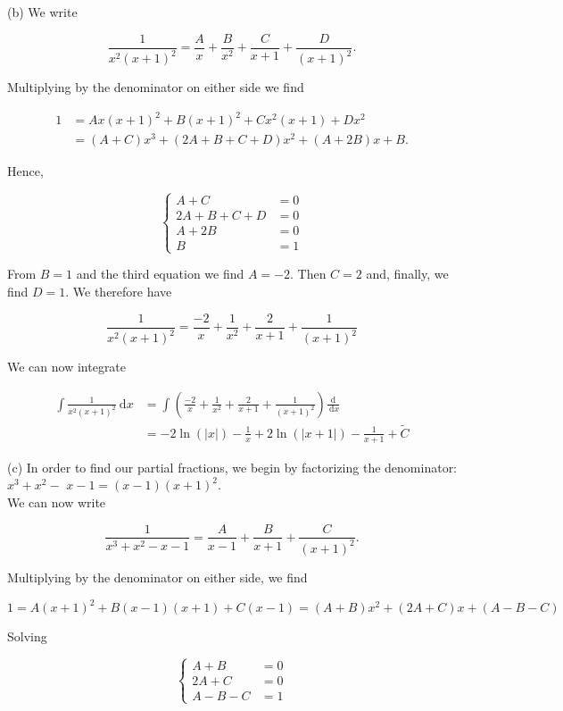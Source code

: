 \documentclass[10pt]{article}
\begin{document}
(b) We write

$$
\frac{1}{x^{2}(x+1)^{2}}=\frac{A}{x}+\frac{B}{x^{2}}+\frac{C}{x+1}+\frac{D}{(x+1)^{2}} .
$$

Multiplying by the denominator on either side we find

$$
\begin{aligned}
1 & =A x(x+1)^{2}+B(x+1)^{2}+C x^{2}(x+1)+D x^{2} \\
& =(A+C) x^{3}+(2 A+B+C+D) x^{2}+(A+2 B) x+B .
\end{aligned}
$$

Hence,

$$
\left\{\begin{aligned}
A+C & =0 \\
2 A+B+C+D & =0 \\
A+2 B & =0 \\
B & =1
\end{aligned}\right.
$$

From $B=1$ and the third equation we find $A=-2$. Then $C=2$ and, finally, we find $D=1$. We therefore have

$$
\frac{1}{x^{2}(x+1)^{2}}=\frac{-2}{x}+\frac{1}{x^{2}}+\frac{2}{x+1}+\frac{1}{(x+1)^{2}}
$$

We can now integrate

$$
\begin{aligned}
\int \frac{1}{x^{2}(x+1)^{2}} \mathrm{~d} x & =\int\left(\frac{-2}{x}+\frac{1}{x^{2}}+\frac{2}{x+1}+\frac{1}{(x+1)^{2}}\right) \frac{\mathrm{d}}{\mathrm{~d} x} \\
& =-2 \ln (|x|)-\frac{1}{x}+2 \ln (|x+1|)-\frac{1}{x+1}+\widetilde{C}
\end{aligned}
$$

(c) In order to find our partial fractions, we begin by factorizing the denominator: $x^{3}+x^{2}-$ $x-1=(x-1)(x+1)^{2}$.\\
We can now write

$$
\frac{1}{x^{3}+x^{2}-x-1}=\frac{A}{x-1}+\frac{B}{x+1}+\frac{C}{(x+1)^{2}} .
$$

Multiplying by the denominator on either side, we find

$$
1=A(x+1)^{2}+B(x-1)(x+1)+C(x-1)=(A+B) x^{2}+(2 A+C) x+(A-B-C)
$$

Solving

$$
\left\{\begin{aligned}
A+B & =0 \\
2 A+C & =0 \\
A-B-C & =1
\end{aligned}\right.
$$
\end{document}
